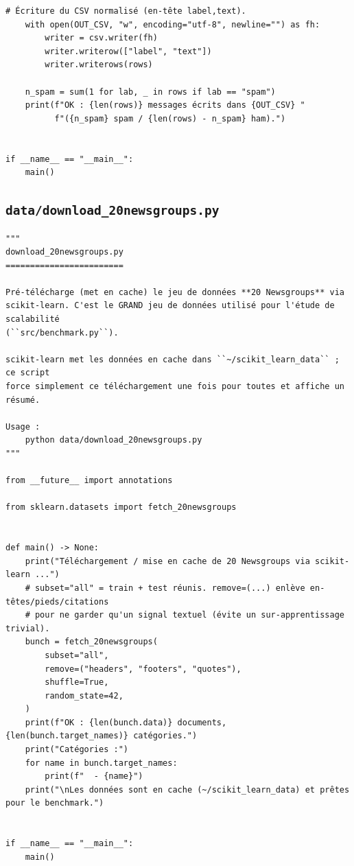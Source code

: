 \begin{lstlisting}[style=py]
    # Écriture du CSV normalisé (en-tête label,text).
    with open(OUT_CSV, "w", encoding="utf-8", newline="") as fh:
        writer = csv.writer(fh)
        writer.writerow(["label", "text"])
        writer.writerows(rows)

    n_spam = sum(1 for lab, _ in rows if lab == "spam")
    print(f"OK : {len(rows)} messages écrits dans {OUT_CSV} "
          f"({n_spam} spam / {len(rows) - n_spam} ham).")


if __name__ == "__main__":
    main()
\end{lstlisting}
\subsection{\texttt{data/download\_20newsgroups.py}}
\begin{lstlisting}[style=py]
"""
download_20newsgroups.py
========================

Pré-télécharge (met en cache) le jeu de données **20 Newsgroups** via
scikit-learn. C'est le GRAND jeu de données utilisé pour l'étude de scalabilité
(``src/benchmark.py``).

scikit-learn met les données en cache dans ``~/scikit_learn_data`` ; ce script
force simplement ce téléchargement une fois pour toutes et affiche un résumé.

Usage :
    python data/download_20newsgroups.py
"""

from __future__ import annotations

from sklearn.datasets import fetch_20newsgroups


def main() -> None:
    print("Téléchargement / mise en cache de 20 Newsgroups via scikit-learn ...")
    # subset="all" = train + test réunis. remove=(...) enlève en-têtes/pieds/citations
    # pour ne garder qu'un signal textuel (évite un sur-apprentissage trivial).
    bunch = fetch_20newsgroups(
        subset="all",
        remove=("headers", "footers", "quotes"),
        shuffle=True,
        random_state=42,
    )
    print(f"OK : {len(bunch.data)} documents, {len(bunch.target_names)} catégories.")
    print("Catégories :")
    for name in bunch.target_names:
        print(f"  - {name}")
    print("\nLes données sont en cache (~/scikit_learn_data) et prêtes pour le benchmark.")


if __name__ == "__main__":
    main()
\end{lstlisting}
